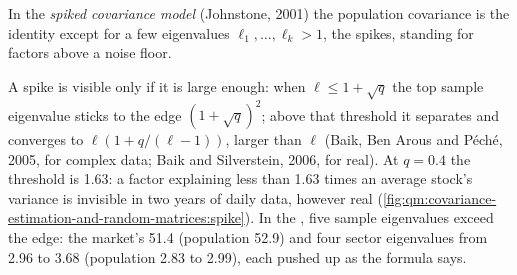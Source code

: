 \begin{definition}\label{def:qm:covariance-estimation-and-random-matrices:spiked}
In the \emph{spiked covariance model} (Johnstone, 2001) the population covariance is the identity except for a few eigenvalues $\ell_1, \dots, \ell_k
> 1$, the spikes, standing for factors above a noise floor.
\end{definition}

A spike is visible only if it is large enough: when $\ell \le 1 + \sqrt q$ the top sample eigenvalue sticks to the edge $(1 + \sqrt q)^2$; above that threshold it separates and
converges to $\ell(1 + q/(\ell - 1))$, larger than $\ell$ (Baik, Ben Arous and Péché, 2005, for complex data; Baik and Silverstein, 2006, for real). At $q = 0.4$ the threshold is
1.63: a factor explaining less than 1.63 times an average stock's variance is invisible in two years of daily data, however real
(\cref{fig:qm:covariance-estimation-and-random-matrices:spike}). In the , five sample eigenvalues exceed the edge: the market's 51.4 (population 52.9) and four sector
eigenvalues from 2.96 to 3.68 (population 2.83 to 2.99), each pushed up as the formula says.

\begin{omfigure}

\label{fig:qm:covariance-estimation-and-random-matrices:spike}
\end{omfigure}

